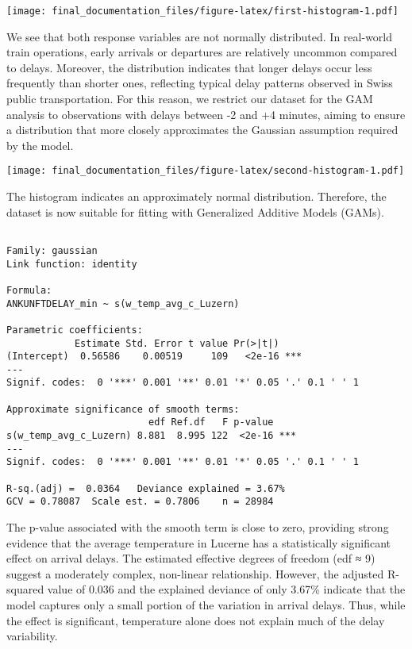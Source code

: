 \documentclass[
]{article}
\begin{document}
\texttt{[image: final\_documentation\_files/figure-latex/first-histogram-1.pdf]}

We see that both response variables are not normally distributed. In
real-world train operations, early arrivals or departures are relatively
uncommon compared to delays. Moreover, the distribution indicates that
longer delays occur less frequently than shorter ones, reflecting
typical delay patterns observed in Swiss public transportation. For this
reason, we restrict our dataset for the GAM analysis to observations
with delays between -2 and +4 minutes, aiming to ensure a distribution
that more closely approximates the Gaussian assumption required by the
model.

\texttt{[image: final\_documentation\_files/figure-latex/second-histogram-1.pdf]}

The histogram indicates an approximately normal distribution. Therefore,
the dataset is now suitable for fitting with Generalized Additive Models
(GAMs).

\begin{verbatim}

Family: gaussian 
Link function: identity 

Formula:
ANKUNFTDELAY_min ~ s(w_temp_avg_c_Luzern)

Parametric coefficients:
            Estimate Std. Error t value Pr(>|t|)    
(Intercept)  0.56586    0.00519     109   <2e-16 ***
---
Signif. codes:  0 '***' 0.001 '**' 0.01 '*' 0.05 '.' 0.1 ' ' 1

Approximate significance of smooth terms:
                         edf Ref.df   F p-value    
s(w_temp_avg_c_Luzern) 8.881  8.995 122  <2e-16 ***
---
Signif. codes:  0 '***' 0.001 '**' 0.01 '*' 0.05 '.' 0.1 ' ' 1

R-sq.(adj) =  0.0364   Deviance explained = 3.67%
GCV = 0.78087  Scale est. = 0.7806    n = 28984
\end{verbatim}

The p-value associated with the smooth term is close to zero, providing
strong evidence that the average temperature in Lucerne has a
statistically significant effect on arrival delays. The estimated
effective degrees of freedom (edf ≈ 9) suggest a moderately complex,
non-linear relationship. However, the adjusted R-squared value of 0.036
and the explained deviance of only 3.67\% indicate that the model
captures only a small portion of the variation in arrival delays. Thus,
while the effect is significant, temperature alone does not explain much
of the delay variability.
\end{document}

